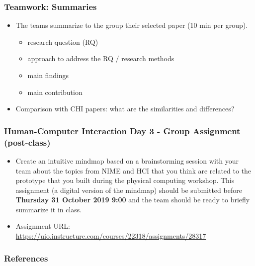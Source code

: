 \documentclass[screen, aspectratio=169]{beamer}
\begin{document}
\begin{frame}
\frametitle{Teamwork: Summaries}
\begin{itemize}
\item The teams summarize to the group their selected paper (10 min per group). 
\begin{itemize}
\item research question (RQ)
\item approach to address the RQ / research methods
\item main findings 
\item main contribution
\end{itemize}
\item Comparison with CHI papers: what are the similarities and differences? 
\end{itemize}
\end{frame}
%
\begin{frame}
\frametitle{Human-Computer Interaction Day 3 - Group Assignment (post-class)}
\begin{itemize}
\item Create an intuitive mindmap based on a brainstorming session with your team about the topics from NIME and HCI that you think are related to the prototype that you built during the physical computing workshop. This assignment (a digital version of the mindmap) should be submitted before \textbf{Thursday 31 October 2019 9:00} and the team should be ready to briefly summarize it in class.
\item Assignment URL: \url{https://uio.instructure.com/courses/22318/assignments/28317}
\end{itemize}
\end{frame}
%
\begin{frame}[shrink=20]
  \frametitle{References}
  \printbibliography
\end{frame}
%
\end{document}
